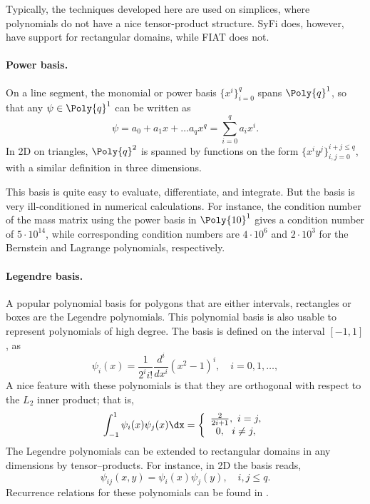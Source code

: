 Typically, the techniques developed here are used on simplices, where
polynomials do not have a nice tensor-product structure.  SyFi does,
however, have support for rectangular domains, while FIAT does not.

\paragraph{Power basis.}
On a line segment, the monomial or power basis $\{ x^i \}_{i=0}^{q}$
spans $\Poly{q}^1$, so that any $\psi \in \Poly{q}^1$ can be written as
\begin{equation}
\label{pn1d}
\psi = a_0 + a_1 x + \ldots a_q x^q = \sum^q_{i=0} a_i x^i.
\end{equation}
In 2D on triangles, $\Poly{q}^2$ is spanned by functions on the form $\{
x^i y^j \}_{i,j=0}^{i+j\leqslant q}$, with a similar definition in three
dimensions.

This basis is quite easy to evaluate, differentiate, and integrate. But
the basis is very ill-conditioned in numerical calculations.
For instance, the condition number of the mass matrix using the power
basis in $\Poly{10}^1$ gives a condition number of $5\cdot10^{14}$, while
corresponding condition numbers are $4\cdot 10^6$ and $2\cdot 10^3$
for the Bernstein and Lagrange polynomials, respectively.

\paragraph{Legendre basis.}

A popular polynomial basis for polygons that are either intervals,
rectangles or boxes are the Legendre polynomials.  This polynomial basis
is also usable to represent polynomials of high degree.  The basis is
defined on the interval $[-1,1]$, as
\begin{equation}
\psi_i(x) = \frac{1}{2^i i!} \frac{d^i}{dx^i} (x^2 -1)^i, \quad i=0,1,\ldots,
\end{equation}
A nice feature with these polynomials is that they are orthogonal with
respect to the $L_2$ inner product; that is,
\begin{equation}
\int_{-1}^1 \psi_i (x) \psi_j(x) \dx  =
\left\{
\begin{array}{c}
\frac{2}{2i+1}, \ i=j, \\
0 , \ \ i\not= j, \\
\end{array}
\right.
\end{equation}
The Legendre polynomials can be extended to rectangular domains in any
dimensions by tensor--products.  For instance, in 2D the basis reads,
\begin{equation}
\psi_{ij}(x,y) = \psi_i(x) \psi_j(y) ,   \quad i,j \leqslant q.
\end{equation}
Recurrence relations for these polynomials can be found in
\citet{KarniadakisSherwin2005}.

